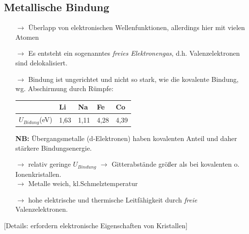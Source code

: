 \subsection{Metallische Bindung} %
\label{kap:1_5}
\begin{itemize}
	\item[$\rightarrow$] Überlapp von elektronischen Wellenfunktionen, allerdings hier mit vielen Atomen
	\item[$\rightarrow$] Es entsteht ein sogenanntes \textit{freies Elektronengas}, d.h. Valenzelektronen sind delokalisiert.
	\item[$\rightarrow$] Bindung ist ungerichtet und nicht so stark, wie die kovalente Bindung, wg. Abschirmung durch Rümpfe:
	\begin{table}[H]
		\centering
		\begin{tabular}{l|l|l|l|l}
						 & Li   & Na   & Fe   & Co   \\
						 \hline
		$U_{Bidung}$(eV) & 1,63 & 1,11 & 4,28 & 4,39 \\    
		\end{tabular}
		\end{table}
	\textbf{NB:} Übergangsmetalle (d-Elektronen)  haben kovalenten Anteil und daher stärkere Bindungsenergie.
	\item[$\rightarrow$] relativ geringe $U_{Bindung}$ $\rightarrow$ Gitterabstände größer als bei kovalenten o. Ionenkristallen.\\
	$\rightarrow$ Metalle weich, kl.Schmelztemperatur
	\item[$\rightarrow$] hohe elektrische und thermische Leitfähigkeit durch \textit{freie} Valenzelektronen.
\end{itemize}
[Details: erfordern elektronische Eigenschaften von Kristallen]

